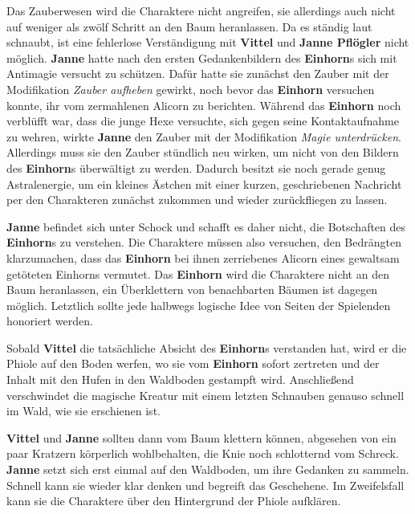 Das Zauberwesen wird die Charaktere nicht angreifen, sie allerdings auch nicht auf weniger als zwölf Schritt an den Baum heranlassen.
Da es ständig laut schnaubt, ist eine fehlerlose Verständigung mit \textbf{Vittel} und \textbf{Janne Pflögler} nicht möglich.
\textbf{Janne} hatte nach den ersten Gedankenbildern des \textbf{Einhorn}s sich mit Antimagie versucht zu schützen.
Dafür hatte sie zunächst den Zauber  mit der Modifikation \textit{Zauber aufheben} gewirkt, noch bevor das \textbf{Einhorn} versuchen konnte, ihr vom zermahlenen Alicorn zu berichten.
Während das \textbf{Einhorn} noch verblüfft war, dass die junge Hexe versuchte, sich gegen seine Kontaktaufnahme zu wehren, wirkte \textbf{Janne} den Zauber  mit der Modifikation \textit{Magie unterdrücken}.
Allerdings muss sie den Zauber stündlich neu wirken, um nicht von den Bildern des \textbf{Einhorn}s überwältigt zu werden.
Dadurch besitzt sie noch gerade genug Astralenergie, um ein kleines Ästchen mit einer kurzen, geschriebenen Nachricht per  den Charakteren zunächst zukommen und wieder zurückfliegen zu lassen. 


\textbf{Janne} befindet sich unter Schock und schafft es daher nicht, die Botschaften des \textbf{Einhorn}s zu verstehen.
Die Charaktere müssen also versuchen, den Bedrängten klarzumachen, dass das \textbf{Einhorn} bei ihnen zerriebenes Alicorn eines gewaltsam getöteten Einhorns vermutet.
Das \textbf{Einhorn} wird die Charaktere nicht an den Baum heranlassen, ein Überklettern von benachbarten Bäumen ist dagegen möglich.
Letztlich sollte jede halbwegs logische Idee von Seiten der Spielenden honoriert werden.


Sobald \textbf{Vittel} die tatsächliche Absicht des \textbf{Einhorn}s verstanden hat, wird er die Phiole auf den Boden werfen, wo sie vom \textbf{Einhorn} sofort zertreten und der Inhalt mit den Hufen in den Waldboden gestampft wird.
Anschließend verschwindet die magische Kreatur mit einem letzten Schnauben genauso schnell im Wald, wie sie erschienen ist.


\textbf{Vittel} und \textbf{Janne} sollten dann vom Baum klettern können, abgesehen von ein paar Kratzern körperlich wohlbehalten, die Knie noch schlotternd vom Schreck.
\textbf{Janne} setzt sich erst einmal auf den Waldboden, um ihre Gedanken zu sammeln. Schnell kann sie wieder klar denken und begreift das Geschehene. Im Zweifelsfall kann sie die Charaktere über den Hintergrund der Phiole aufklären.

